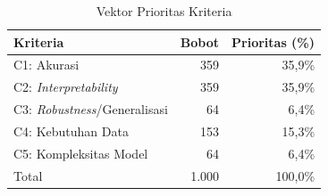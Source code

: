 \begin{table}[H]
	\centering
	\caption{Vektor Prioritas Kriteria}
	\label{tab:prioritas_kriteria}
	\begin{tabular}{|l|r|r|}
		\hline
		Kriteria & Bobot & Prioritas (\%) \\ \hline
		C1: Akurasi & 359 & 35,9\% \\ \hline
		C2: \textit{Interpretability} & 359 & 35,9\% \\ \hline
		C3: \textit{Robustness}/Generalisasi & 64 & 6,4\% \\ \hline
		C4: Kebutuhan Data & 153 & 15,3\% \\ \hline
		C5: Kompleksitas Model & 64 & 6,4\% \\ \hline
		Total & 1.000 & 100,0\% \\ \hline
	\end{tabular}
\end{table}